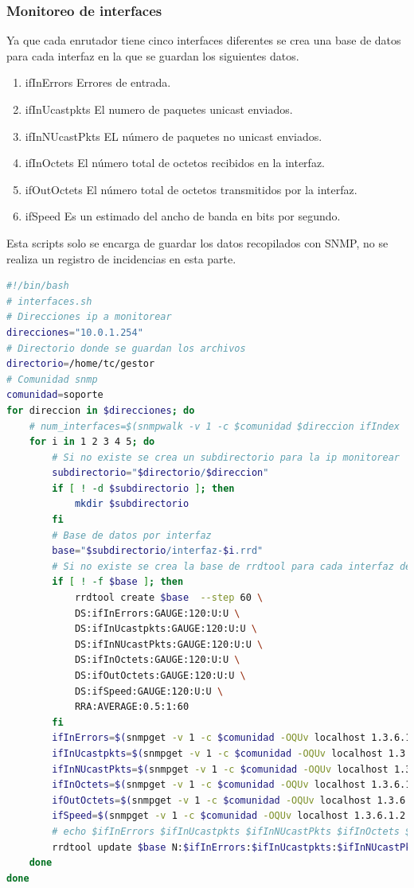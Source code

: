 \documentclass[12pt, titlepage]{article}
\begin{document}
\subsubsection{Monitoreo de interfaces}
Ya que cada enrutador tiene cinco interfaces diferentes se crea una base de datos para cada interfaz en la que se guardan los siguientes datos.
\begin{enumerate}
 \item ifInErrors Errores de entrada.
 \item ifInUcastpkts El numero de paquetes unicast enviados.
 \item ifInNUcastPkts EL número de paquetes no unicast enviados.
 \item ifInOctets El número total de octetos recibidos en la interfaz.
 \item ifOutOctets El número total de octetos transmitidos por la interfaz.
 \item ifSpeed Es un estimado del ancho de banda en bits por segundo.
\end{enumerate}

Esta scripts solo se encarga de guardar los datos recopilados con SNMP, no se realiza un registro de incidencias en esta parte.

\begin{lstlisting}[language=bash]
 #!/bin/bash
# interfaces.sh
# Direcciones ip a monitorear
direcciones="10.0.1.254"
# Directorio donde se guardan los archivos
directorio=/home/tc/gestor
# Comunidad snmp
comunidad=soporte
for direccion in $direcciones; do
    # num_interfaces=$(snmpwalk -v 1 -c $comunidad $direccion ifIndex | awk 'END{print NR}')
    for i in 1 2 3 4 5; do
        # Si no existe se crea un subdirectorio para la ip monitorear
        subdirectorio="$directorio/$direccion"
        if [ ! -d $subdirectorio ]; then
            mkdir $subdirectorio
        fi
        # Base de datos por interfaz
        base="$subdirectorio/interfaz-$i.rrd"
        # Si no existe se crea la base de rrdtool para cada interfaz de ip a monitorear
        if [ ! -f $base ]; then
            rrdtool create $base  --step 60 \
            DS:ifInErrors:GAUGE:120:U:U \
            DS:ifInUcastpkts:GAUGE:120:U:U \
            DS:ifInNUcastPkts:GAUGE:120:U:U \
            DS:ifInOctets:GAUGE:120:U:U \
            DS:ifOutOctets:GAUGE:120:U:U \
            DS:ifSpeed:GAUGE:120:U:U \
            RRA:AVERAGE:0.5:1:60
        fi
        ifInErrors=$(snmpget -v 1 -c $comunidad -OQUv localhost 1.3.6.1.2.1.2.2.1.14.$i)
        ifInUcastpkts=$(snmpget -v 1 -c $comunidad -OQUv localhost 1.3.6.1.2.1.2.2.1.11.$i)
        ifInNUcastPkts=$(snmpget -v 1 -c $comunidad -OQUv localhost 1.3.6.1.2.1.2.2.1.12.$i)
        ifInOctets=$(snmpget -v 1 -c $comunidad -OQUv localhost 1.3.6.1.2.1.2.2.1.10.$i)
        ifOutOctets=$(snmpget -v 1 -c $comunidad -OQUv localhost 1.3.6.1.2.1.2.2.1.16.$i)
        ifSpeed=$(snmpget -v 1 -c $comunidad -OQUv localhost 1.3.6.1.2.1.2.2.1.5.$i)
        # echo $ifInErrors $ifInUcastpkts $ifInNUcastPkts $ifInOctets $ifOutOctets $ifSpeed
        rrdtool update $base N:$ifInErrors:$ifInUcastpkts:$ifInNUcastPkts:$ifInOctets:$ifOutOctets:$ifSpeed
    done
done

\end{lstlisting}
\end{document}
